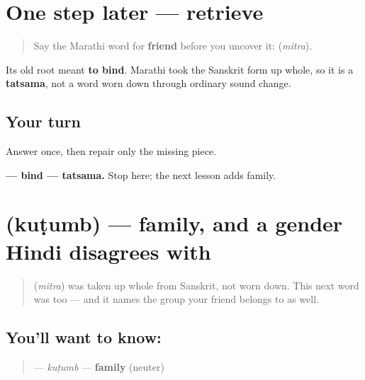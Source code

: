 \section[mitra]{One step later — retrieve }

\label{lesson:MR-R11-mitra-r1}



\begin{quote}
Say the Marathi word for \textbf{friend} before you uncover it: \textbf{} (\emph{mitra}).
\end{quote}

\begin{grammarlens}[title={What you've built}]
Its old root meant \textbf{to bind}. Marathi took the Sanskrit form up whole, so it is a \textbf{tatsama}, not a word worn down through ordinary sound change.
\end{grammarlens}

\subsection*{Your turn}
Answer once, then repair only the missing piece.

\begin{tcolorbox}[breakable,colback=teal!4,colframe=teal!35!black,title={Before you move on}]
\textbf{ — bind — tatsama.} Stop here; the next lesson adds family.
\end{tcolorbox}
\section[kuṭumb]{ (kuṭumb) — family, and a gender Hindi disagrees with}

\label{lesson:MR-C11-kutumb}



\begin{quote}
\textbf{} (\emph{mitra}) was taken up whole from Sanskrit, not worn down. This next word was too — and it names the group your friend belongs to as well.
\end{quote}

\subsection*{You'll want to know: }
\begin{quote}
\textbf{} — \emph{kuṭumb} — \textbf{family} (neuter)
\end{quote}

